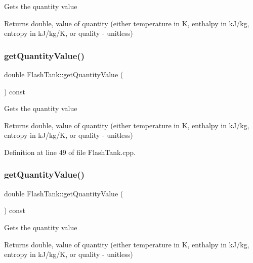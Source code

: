Gets the quantity value \begin{DoxyReturn}{Returns}
double, value of quantity (either temperature in K, enthalpy in k\+J/kg, entropy in k\+J/kg/K, or quality -\/ unitless) 
\end{DoxyReturn}
\mbox{\label{class_flash_tank_ab2145598969881df58736a1b65326d17}} 
\subsubsection{\texorpdfstring{get\+Quantity\+Value()}{getQuantityValue()}\hspace{0.1cm}{\footnotesize\ttfamily [2/3]}}
{\footnotesize\ttfamily double Flash\+Tank\+::get\+Quantity\+Value (\begin{DoxyParamCaption}{ }\end{DoxyParamCaption}) const}

Gets the quantity value \begin{DoxyReturn}{Returns}
double, value of quantity (either temperature in K, enthalpy in k\+J/kg, entropy in k\+J/kg/K, or quality -\/ unitless) 
\end{DoxyReturn}


Definition at line 49 of file Flash\+Tank.\+cpp.

\mbox{\label{class_flash_tank_ab2145598969881df58736a1b65326d17}} 
\subsubsection{\texorpdfstring{get\+Quantity\+Value()}{getQuantityValue()}\hspace{0.1cm}{\footnotesize\ttfamily [3/3]}}
{\footnotesize\ttfamily double Flash\+Tank\+::get\+Quantity\+Value (\begin{DoxyParamCaption}{ }\end{DoxyParamCaption}) const}

Gets the quantity value \begin{DoxyReturn}{Returns}
double, value of quantity (either temperature in K, enthalpy in k\+J/kg, entropy in k\+J/kg/K, or quality -\/ unitless) 
\end{DoxyReturn}
\mbox{\label{class_flash_tank_af5d4f0bf7babe61120e1e4452594e1af}} 
